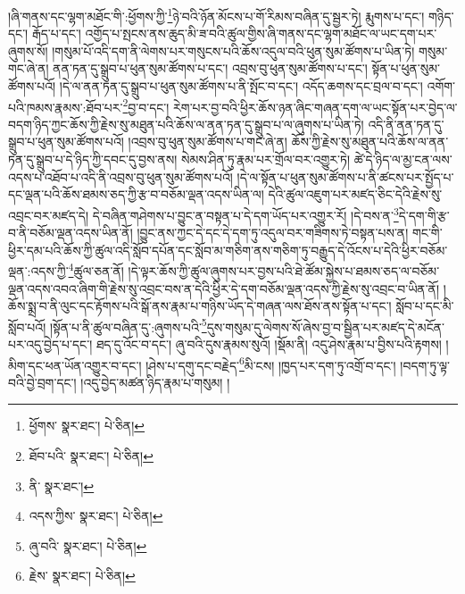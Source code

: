 །ཞི་གནས་དང་ལྷག་མཐོང་གི་:ཕྱོགས་ཀྱི་\footnote{ཕྱོགས་  སྣར་ཐང་།  པེ་ཅིན། }ཉེ་བའི་ཉོན་མོངས་པ་གོ་རིམས་བཞིན་དུ་སྦྱར་ཏེ། རྨུགས་པ་དང་། གཉིད་དང་། རྒོད་པ་དང་། འགྱོད་པ་སྤངས་ནས་ཆུད་མི་ཟ་བའི་ཚུལ་གྱིས་ཞི་གནས་དང་ལྷག་མཐོང་ལ་ཡང་དག་པར་ཞུགས་སོ། །གསུམ་པོ་འདི་དག་ནི་ལེགས་པར་གསུངས་པའི་ཆོས་འདུལ་བའི་ཕུན་སུམ་ཚོགས་པ་ཡིན་ཏེ། གསུམ་གང་ཞེ་ན། ནན་ཏན་དུ་སྒྲུབ་པ་ཕུན་སུམ་ཚོགས་པ་དང་། འབྲས་བུ་ཕུན་སུམ་ཚོགས་པ་དང་། སྟོན་པ་ཕུན་སུམ་ཚོགས་པའོ། །དེ་ལ་ནན་ཏན་དུ་སྒྲུབ་པ་ཕུན་སུམ་ཚོགས་པ་ནི་སྤོང་བ་དང་། འདོད་ཆགས་དང་བྲལ་བ་དང་། འགོག་པའི་ཁམས་རྣམས་:ཐོབ་པར་\footnote{ཐོབ་པའི་  སྣར་ཐང་།  པེ་ཅིན། }བྱ་བ་དང་། རེག་པར་བྱ་བའི་ཕྱིར་ཆོས་ཉན་ཞིང་གཞན་དག་ལ་ཡང་སྟོན་པར་བྱེད་ལ་བདག་ཉིད་ཀྱང་ཆོས་ཀྱི་རྗེས་སུ་མཐུན་པའི་ཆོས་ལ་ནན་ཏན་དུ་སྒྲུབ་པ་ལ་ཞུགས་པ་ཡིན་ཏེ། འདི་ནི་ནན་ཏན་དུ་སྒྲུབ་པ་ཕུན་སུམ་ཚོགས་པའོ། །འབྲས་བུ་ཕུན་སུམ་ཚོགས་པ་གང་ཞེ་ན། ཆོས་ཀྱི་རྗེས་སུ་མཐུན་པའི་ཆོས་ལ་ནན་ཏན་དུ་སྒྲུབ་པ་དེ་ཉིད་ཀྱི་དབང་དུ་བྱས་ནས། སེམས་ཤིན་ཏུ་རྣམ་པར་གྲོལ་བར་འགྱུར་ཏེ། ཚེ་དེ་ཉིད་ལ་མྱ་ངན་ལས་འདས་པ་འཐོབ་པ་འདི་ནི་འབྲས་བུ་ཕུན་སུམ་ཚོགས་པའོ། །དེ་ལ་སྟོན་པ་ཕུན་སུམ་ཚོགས་པ་ནི་ཚངས་པར་སྤྱོད་པ་དང་ལྡན་པའི་ཆོས་ཐམས་ཅད་ཀྱི་རྩ་བ་བཅོམ་ལྡན་འདས་ཡིན་ལ། དེའི་ཚུལ་འཇུག་པར་མཛད་ཅིང་དེའི་རྗེས་སུ་འབྲང་བར་མཛད་དེ། དེ་བཞིན་གཤེགས་པ་བྱུང་ན་བསྟན་པ་དེ་དག་ཡོད་པར་འགྱུར་རོ། །དེ་བས་ན་\footnote{ནི་  སྣར་ཐང་། }དེ་དག་གི་རྩ་བ་ནི་བཅོམ་ལྡན་འདས་ཡིན་ནོ། །བྱུང་ནས་ཀྱང་དེ་དང་དེ་དག་ཏུ་འདུལ་བར་གཟིགས་ཏེ་བསྟན་པས་ན། གང་གི་ཕྱིར་དམ་པའི་ཆོས་ཀྱི་ཚུལ་འདི་སློབ་དཔོན་དང་སློབ་མ་གཅིག་ནས་གཅིག་ཏུ་བརྒྱུད་དེ་འོངས་པ་དེའི་ཕྱིར་བཅོམ་ལྡན་:འདས་ཀྱི་\footnote{འདས་ཀྱིས་  སྣར་ཐང་།  པེ་ཅིན། }ཚུལ་ཅན་ནོ། །དེ་ལྟར་ཆོས་ཀྱི་ཚུལ་ཞུགས་པར་བྱས་པའི་ཐེ་ཚོམ་སྐྱེས་པ་ཐམས་ཅད་ལ་བཅོམ་ལྡན་འདས་འབའ་ཞིག་གི་རྗེས་སུ་འབྲང་བས་ན་དེའི་ཕྱིར་དེ་དག་བཅོམ་ལྡན་འདས་ཀྱི་རྗེས་སུ་འབྲང་བ་ཡིན་ནོ། །ཆོས་སྨྲ་བ་ནི་ལུང་དང་རྟོགས་པའི་སྒོ་ནས་རྣམ་པ་གཉིས་ཡོད་དེ་གཞན་ལས་ཐོས་ནས་སྟོན་པ་དང་། སློབ་པ་དང་མི་སློབ་པའོ། །སྟོན་པ་ནི་ཚུལ་བཞིན་དུ་:ཞུགས་པའི་\footnote{ཞུ་བའི་  སྣར་ཐང་།  པེ་ཅིན། }དུས་གསུམ་དུ་ལེགས་སོ་ཞེས་བྱ་བ་སྦྱིན་པར་མཛད་དེ་མངོན་པར་འདུ་བྱེད་པ་དང་། ཐད་དུ་འོང་བ་དང་། ཞུ་བའི་དུས་རྣམས་སུའོ། །སྡོམ་ནི། འདུ་ཤེས་རྣམ་པ་བྱིས་པའི་རྟགས། །མིག་དང་ཕན་ཡོན་འགྱུར་བ་དང་། །ཤེས་པ་དགུ་དང་བརྗེད་\footnote{རྗེས་  སྣར་ཐང་།  པེ་ཅིན། }མི་ངས། །ཁྱད་པར་དག་ཏུ་འགྲོ་བ་དང་། །བདག་ཏུ་ལྟ་བའི་བྱེ་བྲག་དང་། །འདུ་བྱེད་མཚན་ཉིད་རྣམ་པ་གསུམ། །
